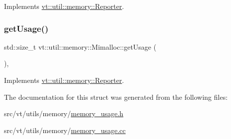 Implements \hyperlink{structvt_1_1util_1_1memory_1_1_reporter_a83fc36e9cff3ce2deedf1d4546694713}{vt\+::util\+::memory\+::\+Reporter}.

\mbox{\label{structvt_1_1util_1_1memory_1_1_mimalloc_ab404700265f120eedb4cf06e4ae0b602}} 
\subsubsection{\texorpdfstring{get\+Usage()}{getUsage()}}
{\footnotesize\ttfamily std\+::size\+\_\+t vt\+::util\+::memory\+::\+Mimalloc\+::get\+Usage (\begin{DoxyParamCaption}{ }\end{DoxyParamCaption})\hspace{0.3cm}{\ttfamily [override]}, {\ttfamily [virtual]}}



Implements \hyperlink{structvt_1_1util_1_1memory_1_1_reporter_a372574f51fdb68077cd3d227ee373de5}{vt\+::util\+::memory\+::\+Reporter}.



The documentation for this struct was generated from the following files\+:\begin{DoxyCompactItemize}
\item 
src/vt/utils/memory/\hyperlink{memory__usage_8h}{memory\+\_\+usage.\+h}\item 
src/vt/utils/memory/\hyperlink{memory__usage_8cc}{memory\+\_\+usage.\+cc}\end{DoxyCompactItemize}
